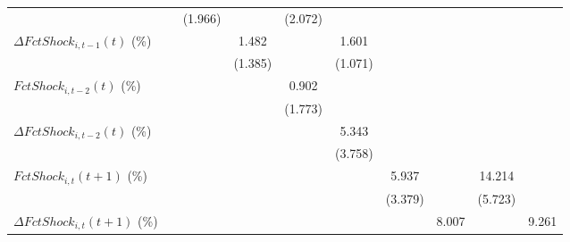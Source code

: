 {\begin{tabular}{l*{9}{c}}
                    &                     &     (1.966)         &                     &     (2.072)         &                     &                     &                     &                     &                     \\
\addlinespace
$ \Delta FctShock_{i,t-1}(t)$ (\%)&                     &                     &       1.482         &                     &       1.601         &                     &                     &                     &                     \\
                    &                     &                     &     (1.385)         &                     &     (1.071)         &                     &                     &                     &                     \\
\addlinespace
$ FctShock_{i,t-2}(t)$ (\%)&                     &                     &                     &       0.902         &                     &                     &                     &                     &                     \\
                    &                     &                     &                     &     (1.773)         &                     &                     &                     &                     &                     \\
\addlinespace
$ \Delta FctShock_{i,t-2}(t)$ (\%)&                     &                     &                     &                     &       5.343         &                     &                     &                     &                     \\
                    &                     &                     &                     &                     &     (3.758)         &                     &                     &                     &                     \\
\addlinespace
$ FctShock_{i,t}(t+1)$ (\%)&                     &                     &                     &                     &                     &       5.937         &                     &      14.214\sym{**} &                     \\
                    &                     &                     &                     &                     &                     &     (3.379)         &                     &     (5.723)         &                     \\
\addlinespace
$ \Delta FctShock_{i,t}(t+1)$ (\%)&                     &                     &                     &                     &                     &                     &       8.007\sym{**} &                     &       9.261\sym{***}\\

\end{tabular}}
